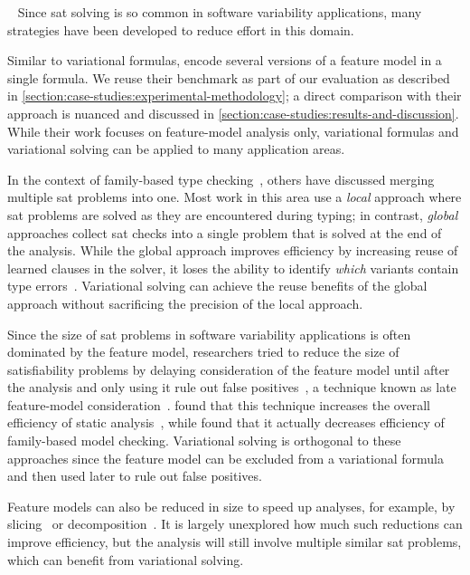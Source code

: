 ~\label{section:related-work:reasoning-about-variability}
%
Since \ac{sat} solving is so common in software variability applications, many
strategies have been developed to reduce effort in this domain.

Similar to variational formulas, \citet{NMS+:GPCE18} encode several versions of
a feature model in a single formula. We reuse their benchmark as part of our
evaluation as described in
\autoref{section:case-studies:experimental-methodology}; a direct comparison
with their approach is nuanced and discussed in
\autoref{section:case-studies:results-and-discussion}.
%
While their work focuses on feature-model analysis only, variational formulas
and variational solving can be applied to many application areas.

In the context of family-based type checking~\citep{TAK+:CSUR14}, others have
discussed merging multiple \ac{sat} problems into one.
%
Most work in this area use a \emph{local} approach where \ac{sat} problems are
solved as they are encountered during typing; in contrast, \emph{global}
approaches collect \ac{sat} checks into a single problem that is solved at the
end of the analysis.
%
While the global approach improves efficiency by increasing reuse of learned
clauses in the solver, it loses the ability to identify \emph{which} variants
contain type errors~\citep{ASLK:FOSD10,HZS:SCP11}.
%
Variational solving can achieve the reuse benefits of the global approach
without sacrificing the precision of the local approach.


Since the size of \ac{sat} problems in software variability applications is often
dominated by the feature model, researchers tried to reduce the size of
satisfiability problems by delaying consideration of the feature model until
after the analysis and only using it rule out false
positives~\citep{BMB+:PLDI13,CCS+13,LKA+:ESECFSE13}, a technique known as late
feature-model consideration~\citep{TAK+:CSUR14}.
%
\citet{BMB+:PLDI13} found that this technique increases the overall efficiency
of static analysis~\citep{BMB+:PLDI13}, while \citet{CCS+13} found that it
actually decreases efficiency of family-based model checking. Variational
solving is orthogonal to these approaches since the feature model can be
excluded from a variational formula and then used later to rule out false
positives.


Feature models can also be reduced in size to speed up analyses, for example,
by slicing~\citep{ACLF:ASE11,KST+:SPLC16} or decomposition~\citep{SKT+:ICSE16}.
It is largely unexplored how much such reductions can improve efficiency, but the
analysis will still involve multiple similar \ac{sat} problems, which can
benefit from variational solving.


